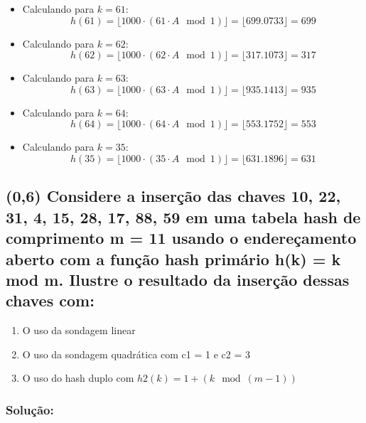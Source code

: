 \documentclass{article}
\begin{document}
   \begin{itemize}
       \item Calculando para \( k = 61 \):
       \[
       h(61) = \lfloor 1000 \cdot (61 \cdot A \mod 1) \rfloor = \lfloor 699.0733 \rfloor = 699
       \]

       \item Calculando para \( k = 62 \):
       \[
       h(62) = \lfloor 1000 \cdot (62 \cdot A \mod 1) \rfloor = \lfloor 317.1073 \rfloor = 317
       \]

       \item Calculando para \( k = 63 \):
       \[
       h(63) = \lfloor 1000 \cdot (63 \cdot A \mod 1) \rfloor = \lfloor 935.1413 \rfloor = 935
       \]

       \item Calculando para \( k = 64 \):
       \[
       h(64) = \lfloor 1000 \cdot (64 \cdot A \mod 1) \rfloor = \lfloor 553.1752 \rfloor = 553
       \]

       \item Calculando para \( k = 35 \):
       \[
       h(35) = \lfloor 1000 \cdot (35 \cdot A \mod 1) \rfloor = \lfloor 631.1896 \rfloor = 631
       \]
   \end{itemize}

\subsection {(0,6) Considere a inserção das chaves 10, 22, 31, 4, 15, 28, 17, 88, 59 em uma tabela
hash de comprimento m = 11 usando o endereçamento aberto com a função hash
primário h(k) = k mod m.
Ilustre o resultado da inserção dessas chaves com:}
\begin{enumerate}[label=\alph*)]
  \item O uso da sondagem linear
  \item O uso da sondagem quadrática com c1 = 1 e c2 = 3
  \item O uso do hash duplo com $ h2(k) = 1 + (k \mod (m - 1))$
\end{enumerate}

\subsubsection{Solução:}
\end{document}

